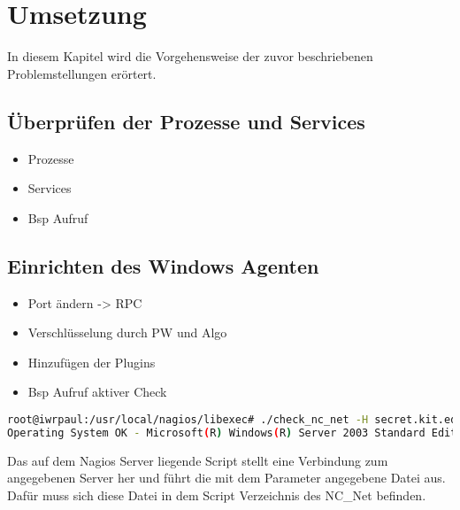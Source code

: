 \section{Umsetzung}
In diesem Kapitel wird die Vorgehensweise der zuvor beschriebenen Problemstellungen erörtert.

\subsection{Überprüfen der Prozesse und Services}
\begin{itemize}
\item Prozesse
\item Services
\item Bsp Aufruf
\end{itemize}

\subsection{Einrichten des Windows Agenten}
\begin{itemize}
\item Port ändern -> RPC
\item Verschlüsselung durch PW und Algo
\item Hinzufügen der Plugins
\item Bsp Aufruf aktiver Check
\end{itemize}

\begin{lstlisting}[captionpos=b, caption=Aufruf eines aktiven Checks, label=activecheckexample, breaklines = true, language=bash]
root@iwrpaul:/usr/local/nagios/libexec# ./check_nc_net -H secret.kit.edu -p 123456 -s secret -v RUNSCRIPT -l check_uname.exe
Operating System OK - Microsoft(R) Windows(R) Server 2003 Standard Edition Service Pack 2
\end{lstlisting}

Das auf dem Nagios Server liegende Script  stellt eine Verbindung zum angegebenen Server her und führt die mit dem Parameter  angegebene Datei aus. Dafür muss sich diese Datei in dem Script Verzeichnis des NC\_Net befinden.


